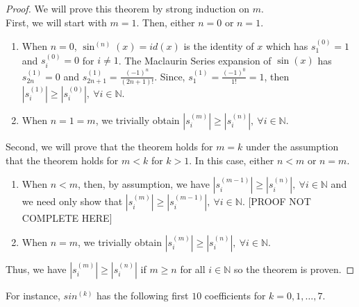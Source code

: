 \documentclass{article}
\begin{document}
    \begin{proof}
        We will prove this theorem by strong induction on $m$.\\
        
        First, we will start with $m = 1$. Then, either $n = 0$ or $n = 1$.
        
        \begin{enumerate}
            \item When $n = 0$, $\sin^{(n)}(x) = id(x)$ is the identity of $x$ which has $s_1^{(0)} = 1$ and $s_i^{(0)} = 0$ for $i \neq 1$. The Maclaurin Series expansion of $\sin(x)$ has $s_{2n}^{(1)} = 0$ and $s_{2n+1}^{(1)} = \frac{(-1)^n}{(2n+1)!}$. Since, $s_{1}^{(1)} = \frac{(-1)^0}{1!} = 1$, then $\left|s_{i}^{(1)}\right| \geq \left|s_{i}^{(0)}\right|,\ \forall i \in \mathbb{N}$. 
            
            \item When $n = 1 = m$, we trivially obtain $\left|s_{i}^{(m)}\right| \geq \left|s_{i}^{(n)}\right|,\ \forall i \in \mathbb{N}$.
        \end{enumerate}
        
        Second, we will prove that the theorem holds for $m = k$ under the assumption that the theorem holds for $m < k$ for $k > 1$. In this case, either $n < m$ or $n = m$.
        
        \begin{enumerate}
            \item When $n < m$, then, by assumption, we have $\left|s_{i}^{(m-1)}\right| \geq \left|s_{i}^{(n)}\right|,\ \forall i \in \mathbb{N}$ and we need only show that $\left|s_{i}^{(m)}\right| \geq \left|s_{i}^{(m-1)}\right|,\ \forall i \in \mathbb{N}$. [PROOF NOT COMPLETE HERE]
            
            \item When $n = m$, we trivially obtain $\left|s_{i}^{(m)}\right| \geq \left|s_{i}^{(n)}\right|,\ \forall i \in \mathbb{N}$.
        \end{enumerate}
        
        Thus, we have $\left|s_i^{(m)}\right| \geq \left|s_i^{(n)}\right|$ if $m \geq n$ for all $i \in \mathbb{N}$ so the theorem is proven.
    \end{proof}

    For instance, $sin^{(k)}$ has the following first $10$ coefficients for $k = 0, 1, \ldots, 7$.
\end{document}
